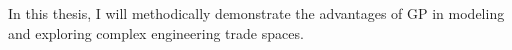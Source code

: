 
In this thesis, I will methodically demonstrate the advantages of \gls{GP} in modeling
and exploring complex engineering trade spaces.



